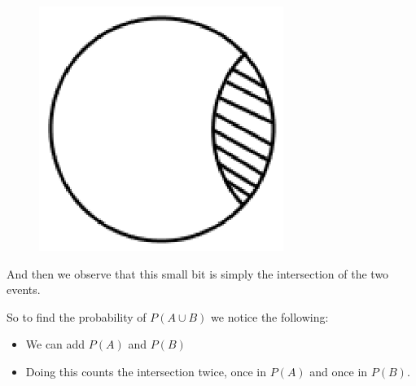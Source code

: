 	\begin{figure}[H] %
    \begin{center}
    \label{m39377*id1112!!!underscore!!!media}\label{m39377*id1112!!!underscore!!!printimage}\includegraphics[width=300px]{col11306.imgs/m39377_identity1.png} %
        
      \vspace{2pt}
    \vspace{.1in}
    
    \end{center}

 \end{figure}   

    \addtocounter{footnote}{-0}
    
And then we observe that this small bit is simply the intersection of the two events.\par \label{m39377*eip-609}So to find the probability of \begin{math}P\left(A\cup B\right)\end{math} we notice the following: \label{m39377*id9324}\begin{itemize}[noitemsep]
            \item We can add  \begin{math}P\left(A\right)\end{math} and  \begin{math}P\left(B\right)\end{math}\item Doing this counts the intersection twice, once in \begin{math}P\left(A\right)\end{math} and once in \begin{math}P\left(B\right)\end{math}.\end{itemize}
        
